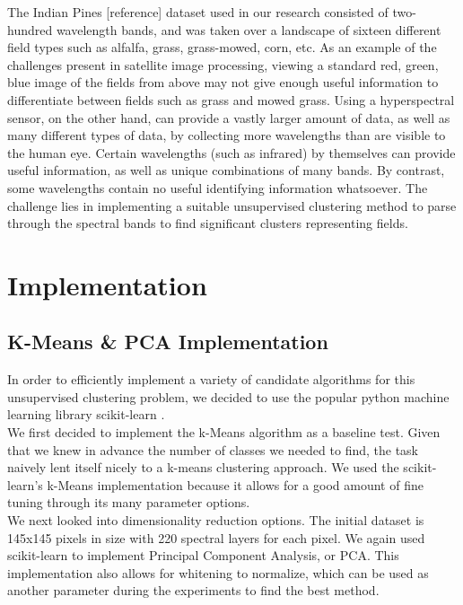 \documentclass[journal]{IEEEtran}
\begin{document}
The Indian Pines [reference] dataset used in our research consisted of two-hundred wavelength bands, and was taken over a landscape of sixteen different field types such as alfalfa, grass, grass-mowed, corn, etc.  As an example of the challenges present in satellite image processing, viewing a standard red, green, blue image of the fields from above may not give enough useful information to differentiate between fields such as grass and mowed grass.  Using a hyperspectral sensor, on the other hand, can provide a vastly larger amount of data, as well as many different types of data, by collecting more wavelengths than are visible to the human eye. Certain wavelengths (such as infrared) by themselves can provide useful information, as well as unique combinations of many bands.  By contrast, some wavelengths contain no useful identifying information whatsoever.  The challenge lies in implementing a suitable unsupervised clustering method to parse through the spectral bands to find significant clusters representing fields.\\



\section{Implementation}
  \subsection{K-Means \& PCA Implementation}
    In order to efficiently implement a variety of candidate algorithms for this unsupervised clustering problem, we decided to use the popular python machine learning library scikit-learn \cite{ScikitLearnAPI}.\\

    We first decided to implement the k-Means algorithm as a baseline test. Given that we knew in advance the number of classes we needed to find, the task naively lent itself nicely to a k-means clustering approach. We used the scikit-learn's k-Means \cite{ScikitLearnAPI} implementation because it allows for a good amount of fine tuning through its many parameter options.\\

    We next looked into dimensionality reduction options. The initial dataset is 145x145 pixels in size with 220 spectral layers for each pixel. We again used scikit-learn to implement Principal Component Analysis, or PCA. This implementation also allows for whitening to normalize, which can be used as another parameter during the experiments to find the best method.\\
\end{document}
